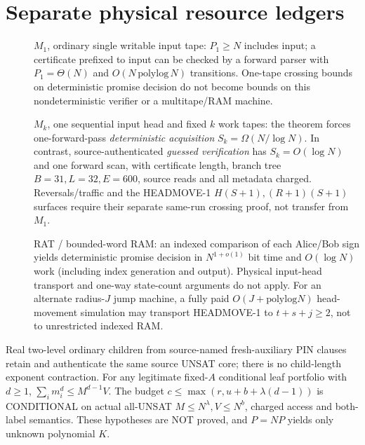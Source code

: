 \documentclass[11pt]{article}
\begin{document}
\section{Separate physical resource ledgers}
\begin{description}
\item[] $M_1$, ordinary single writable input tape:
$P_1\ge N$ includes input; a certificate prefixed to input can
be checked by a forward parser with $P_1=\Theta(N)$ and
$O(N\,\mathrm{polylog}\,N)$ transitions. One-tape
crossing bounds on deterministic promise decision do not become
bounds on this nondeterministic verifier or a multitape/RAM machine.
\item[] $M_k$, one sequential input head and fixed $k$ work tapes:
the theorem forces one-forward-pass \emph{deterministic acquisition}
$S_k=\Omega(N/\log N)$. In contrast, source-authenticated
\emph{guessed verification} has $S_k=O(\log N)$ and one forward
scan, with certificate length, branch tree $B=31,L=32,E=600$,
source reads and all metadata charged. Reversals/traffic and the
HEADMOVE-1 $H(S+1), (R+1)(S+1)$ surfaces require their separate
same-run crossing proof, not transfer from $M_1$.
\item[] RAT / bounded-word RAM:
an indexed comparison of each Alice/Bob sign yields deterministic
promise decision in $N^{1+o(1)}$ bit time and $O(\log N)$ work
(including index generation and output). Physical input-head
transport and one-way state-count arguments do not apply.
For an alternate radius-$J$ jump machine, a fully paid
$O(J+\mathrm{polylog}N)$ head-movement simulation may transport
HEADMOVE-1 to $t+s+j\ge2$, not to unrestricted indexed RAM.
\end{description}
Real two-level ordinary children from source-named fresh-auxiliary
PIN clauses retain and authenticate the same source UNSAT core;
there is no child-length exponent contraction.
For any legitimate fixed-$A$ conditional leaf portfolio with
$d\ge1$, $\sum_i m_i^d\le M^{d-1}V$.
The budget $c\le\max(r,u+b+\lambda(d-1))$ is CONDITIONAL
on actual all-UNSAT $M\le N^\lambda,V\le N^b$,
charged access and both-label semantics. These hypotheses
are NOT proved, and $P=NP$ yields only unknown polynomial $K$.
\end{document}
